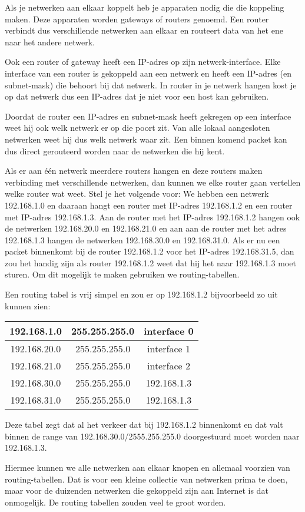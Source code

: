 Als je netwerken aan elkaar koppelt heb je apparaten nodig die die koppeling maken. Deze apparaten worden gateways of routers genoemd. Een router verbindt dus verschillende netwerken aan elkaar en routeert data van het ene naar het andere netwerk.

Ook een router of gateway heeft een IP-adres op zijn netwerk-interface. Elke interface van een router is gekoppeld aan een netwerk en heeft een IP-adres (en subnet-mask) die behoort bij dat netwerk. In router in je netwerk hangen kost je op dat netwerk dus een IP-adres dat je niet voor een host kan gebruiken.

Doordat de router een IP-adres en subnet-mask heeft gekregen op een interface weet hij ook welk netwerk er op die poort zit. Van alle lokaal aangesloten netwerken weet hij dus welk netwerk waar zit. Een binnen komend packet kan dus direct gerouteerd worden naar de netwerken die hij kent.

Als er aan \'e\'en netwerk meerdere routers hangen en deze routers maken verbinding met verschillende netwerken, dan kunnen we elke router gaan vertellen welke router wat weet. Stel je het volgende voor: We hebben een netwerk 192.168.1.0 en daaraan hangt een router met IP-adres 192.168.1.2 en een router met IP-adres 192.168.1.3. Aan de router met het IP-adres 192.168.1.2 hangen ook de netwerken 192.168.20.0 en 192.168.21.0 en aan aan de router met het adres 192.168.1.3 hangen de netwerken 192.168.30.0 en 192.168.31.0. Als er nu een packet binnenkomt bij de router 192.168.1.2 voor het IP-adres 192.168.31.5, dan zou het handig zijn als router 192.168.1.2 weet dat hij het naar 192.168.1.3 moet sturen. Om dit mogelijk te maken gebruiken we routing-tabellen.

Een routing tabel is vrij simpel en zou er op 192.168.1.2 bijvoorbeeld zo uit kunnen zien:

\begin{tabular}{ |c|c|c| }
\hline
192.168.1.0 & 255.255.255.0 & interface 0 \\
\hline
192.168.20.0 & 255.255.255.0 & interface 1 \\
\hline
192.168.21.0 & 255.255.255.0 & interface 2 \\
192.168.30.0 & 255.255.255.0 & 192.168.1.3 \\
\hline
192.168.31.0 & 255.255.255.0 & 192.168.1.3 \\
\hline
\end{tabular}

Deze tabel zegt dat al het verkeer dat bij 192.168.1.2 binnenkomt en dat valt binnen de range van 192.168.30.0/2555.255.255.0 doorgestuurd moet worden naar 192.168.1.3.

Hiermee kunnen we alle netwerken aan elkaar knopen en allemaal voorzien van routing-tabellen. Dat is voor een kleine collectie van netwerken prima te doen, maar voor de duizenden netwerken die gekoppeld zijn aan Internet is dat onmogelijk. De routing tabellen zouden veel te groot worden.
